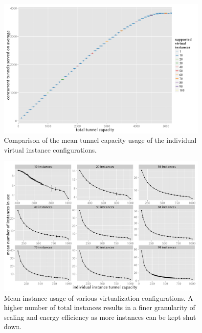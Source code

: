 \documentclass{beamer}
\begin{document}
\begin{frame}
	\begin{figure}
		\includegraphics[height=7cm]{../../chapters/04-mobilenets/images/R-virtualized-tunnelusage.pdf}
		\caption{Comparison of the mean tunnel capacity usage of the individual virtual instance configurations.}
	\end{figure}
\end{frame}

\begin{frame}
	\begin{figure}
		\includegraphics[height=7cm]{../../chapters/04-mobilenets/images/R-virtualized-mean-instanceusage.pdf}
		\caption{Mean instance usage of various virtualization configurations. A higher number of total instances results in a finer granularity of scaling and energy efficiency as more instances can be kept shut down.}
	\end{figure}
\end{frame}
\end{document}
